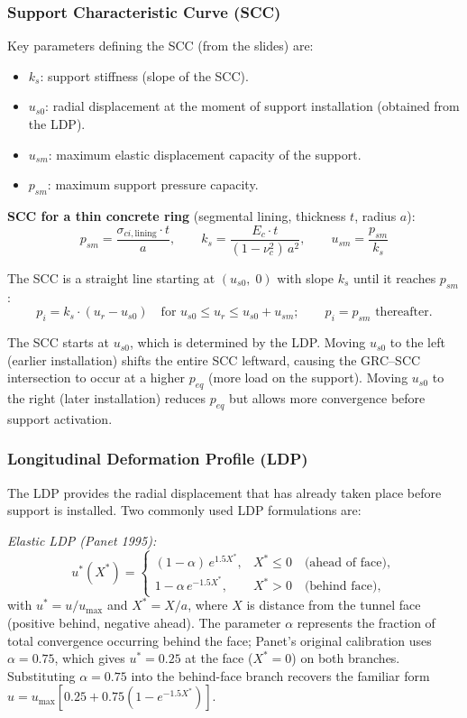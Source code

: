 \documentclass[a4paper,12pt]{article}
\begin{document}
\subsubsection{Support Characteristic Curve (SCC)}
Key parameters defining the SCC (from the slides) are:
\begin{itemize}
    \item $k_s$: support stiffness (slope of the SCC).
    \item $u_{s0}$: radial displacement at the moment of support installation (obtained from the LDP).
    \item $u_{sm}$: maximum elastic displacement capacity of the support.
    \item $p_{sm}$: maximum support pressure capacity.
\end{itemize}

\textbf{SCC for a thin concrete ring} (segmental lining, thickness $t$, radius $a$):
\[
p_{sm} = \frac{\sigma_{ci,\text{lining}} \cdot t}{a}, \qquad
k_s = \frac{E_c \cdot t}{(1-\nu_c^2)\,a^2}, \qquad
u_{sm} = \frac{p_{sm}}{k_s}
\]

The SCC is a straight line starting at $(u_{s0},\; 0)$ with slope $k_s$ until it reaches $p_{sm}$:
\[
p_i = k_s \cdot (u_r - u_{s0}) \quad \text{for } u_{s0} \leq u_r \leq u_{s0}+u_{sm}; \qquad p_i = p_{sm} \text{ thereafter.}
\]

\begin{warnbox}
The SCC starts at $u_{s0}$, which is determined by the LDP. Moving $u_{s0}$ to the left (earlier installation) shifts the entire SCC leftward, causing the GRC--SCC intersection to occur at a higher $p_{eq}$ (more load on the support). Moving $u_{s0}$ to the right (later installation) reduces $p_{eq}$ but allows more convergence before support activation.
\end{warnbox}

\subsubsection{Longitudinal Deformation Profile (LDP)}
The LDP provides the radial displacement that has already taken place before support is installed. Two commonly used LDP formulations are:

\textit{Elastic LDP (Panet 1995):}
\[
u^*(X^*) =
\begin{cases}
(1 - \alpha)\,e^{1.5X^*}, & X^* \leq 0 \quad \text{(ahead of face)},\\[4pt]
1 - \alpha\,e^{-1.5X^*}, & X^* > 0 \quad \text{(behind face)},
\end{cases}
\]
with $u^* = u/u_{\max}$ and $X^* = X/a$, where $X$ is distance from the tunnel face (positive behind, negative ahead). The parameter $\alpha$ represents the fraction of total convergence occurring behind the face; Panet's original calibration uses $\alpha = 0.75$, which gives $u^* = 0.25$ at the face ($X^* = 0$) on both branches. Substituting $\alpha = 0.75$ into the behind-face branch recovers the familiar form $u = u_{\max}[0.25 + 0.75(1 - e^{-1.5X^*})]$.
\end{document}
